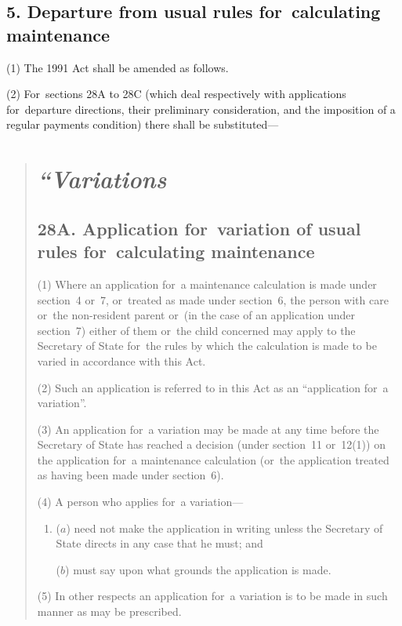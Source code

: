 \documentclass[12pt,a4paper]{article}
\begin{document}
\subsection{5. Departure from usual rules for~calculating maintenance}

(1) The 1991 Act shall be amended as follows.

(2) For~sections 28A to 28C (which deal respectively with applications for~departure directions, their preliminary consideration, and the imposition of a regular payments condition) there shall be substituted—

\begin{quotation}
\section*{\itshape “Variations}

\subsection*{28A. Application for~variation of usual rules for~calculating maintenance}

(1) Where an application for~a maintenance calculation is made under section~4 or~7, or~treated as made under section~6, the person with care or~the non-resident parent or~(in the case of an application under section~7) either of them or~the child concerned may apply to the Secretary of State for~the rules by which the calculation is made to be varied in accordance with this Act.

(2) Such an application is referred to in this Act as an “application for~a variation”.

(3) An application for~a variation may be made at any time before the Secretary of State has reached a decision (under section~11 or~12(1)) on the application for~a maintenance calculation (or~the application treated as having been made under section~6).

(4) A person who applies for~a variation—
\begin{enumerate}\item[]
($a$) need not make the application in writing unless the Secretary of State directs in any case that he must; and

($b$) must say upon what grounds the application is made.
\end{enumerate}

(5) In other respects an application for~a variation is to be made in such manner as may be prescribed.


\end{quotation}
\end{document}
